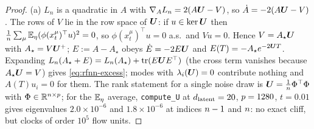\begin{proof}
(a) $L_n$ is a quadratic in $A$ with $\nabla_AL_n=2(A\bm{U}-V)$, so $\dot A=-2(A\bm{U}-V)$. The rows of $V$ lie in the row space of $\bm{U}$: if $u\in\ker\bm{U}$ then $\frac1n\sum_\mu\mathbb{E}_\eta(\phi(x_t^\mu)^{\top}u)^2=0$, so $\phi(x_t^\mu)^{\top}u=0$ a.s.\ and $Vu=0$. Hence $V=A_\star\bm{U}$ with $A_\star=V\bm{U}^{+}$; $E:=A-A_\star$ obeys $\dot E=-2E\bm{U}$ and $E(T)=-A_\star e^{-2\bm{U} T}$. Expanding $L_n(A_\star+E)=L_n(A_\star)+\operatorname{tr}(E\bm{U} E^{\top})$ (the cross term vanishes because $A_\star\bm{U}=V$) gives \eqref{eq:rfnn-excess}; modes with $\lambda_i(\bm{U})=0$ contribute nothing and $A(T)u_i=0$ for them. The rank statement for a single noise draw is $\bm{U}=\frac1n\Phi^{\top}\Phi$ with $\Phi\in\mathbb{R}^{n\times p}$; for the $\mathbb{E}_\eta$ average, \texttt{compute\_U} at $d_{\mathrm{latent}}=20$, $p=1280$, $t=0.01$ gives eigenvalues $2.0\times10^{-6}$ and $1.8\times10^{-6}$ at indices $n-1$ and $n$: no exact cliff, but clocks of order $10^5$ flow units.

\end{proof}
